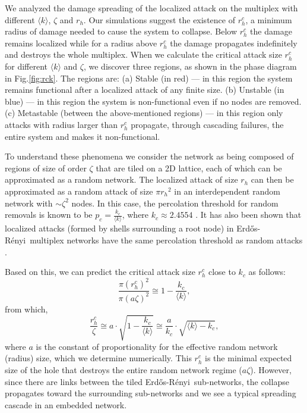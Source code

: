 \documentclass[twocolumn,noshowpacs,pre,preprintnumbers,superscriptaddress,amsmath,amssymb,floatfix]{revtex4}
\newcommand{\kk}{\langle k \rangle}
\newcommand{\er}{Erd\H{o}s-R\'{e}nyi}
\begin{document}
	We analyzed the damage spreading of the localized attack on the multiplex with different $\kk$, $\zeta$ and $r_h$. Our simulations suggest the existence of $r_h^c$, a minimum radius of damage needed to cause the system to collapse. 
	Below $r_h^c$ the damage remains localized while for a radius above $r_h^c$ the damage propagates indefinitely and destroys the whole multiplex.
	When we calculate the critical attack size $r_h^c$ for different $\kk$ and $\zeta$, we discover three regions, as shown in the phase diagram in Fig.\ref{fig:rck}. 
	The regions are:
	(a) Stable (in red) --- in this region the system remains functional after a localized attack of any finite size.
	(b) Unstable (in blue) --- in this region the system is non-functional even if no nodes are removed.
	(c) Metastable (between the above-mentioned regions) --- in this region only attacks with radius larger than $r_h^c$ propagate, through cascading failures, the entire system and makes it non-functional.
	
	To understand these phenomena we consider the network as being composed of regions of size of order $\zeta$ that are tiled on a 2D lattice, each of which can be approximated as a random network. %
	The localized attack of size $r_h$ can then be approximated as a random attack of size $\pi{r_h}^2$ in an interdependent random network with $\sim \zeta^2$ nodes.
	In this case, the percolation threshold for random removals is known to be $p_c = \frac{k_c}{\kk}$, where $k_c \approx 2.4554$ \cite{buldyrev-nature2010}.
	It has also been shown that localized attacks (formed by shells surrounding a root node) in \er~multiplex networks have the same percolation threshold as random attacks \cite{shao-njp2015,yuan-pre2015}.
	
	Based on this, we can predict the critical attack size $r_h^c$ close to $k_c$ as follows:
	\begin{equation}
	\frac{\pi(r_{h}^{c})^{2}}{\pi(a\zeta)^2} \cong 1 - \frac{k_c}{\kk},
	\label{eq:small_zeta_exact}
	\end{equation}
	from which,
	\begin{equation}
	\frac{r_{h}^{c}}{\zeta} \cong a \cdot \sqrt{1 - \frac{k_c}{\kk}} \cong \frac{a}{k_c} \cdot \sqrt{\kk - k_c}
	\label{eq:small_zeta_approximation},
	\end{equation}
	where $a$ is the constant of proportionality for the effective random network (radius) size, which we determine numerically.
	This $r_{h}^{c}$ is the minimal expected size of the hole that destroys the entire random network regime ($a\zeta$). %
	However, since there are links between the tiled \er~sub-networks, the collapse propagates toward the surrounding sub-networks and we see a typical spreading cascade in an embedded network.
	
\end{document}

